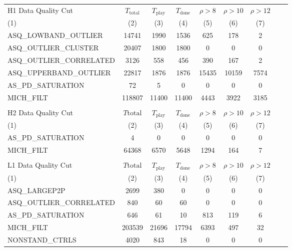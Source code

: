 \begin{table}[p]
\label{t:s2dqresults}
\begin{center}
\begin{tabular}{lcccccccc}
H1 Data Quality Cut      &$T_\mathrm{total}$&$T_\mathrm{play}$&$T_\mathrm{done}$&$\rho>8$&$\rho>10$&$\rho>12$ \\
(1)                      &(2)     &(3)    &(4)    &(5)     &(6)     &(7)\\\hline
ASQ\_LOWBAND\_OUTLIER    &  14741 &  1990 &  1536 &   625  &  178   &   2 \\
ASQ\_OUTLIER\_CLUSTER    &  20407 &  1800 &  1800 &     0  &    0   &   0 \\
ASQ\_OUTLIER\_CORRELATED &   3126 &   558 &   456 &   390  &  167   &   2 \\
ASQ\_UPPERBAND\_OUTLIER  &  22817 &  1876 &  1876 & 15435  &10159   &7574 \\
AS\_PD\_SATURATION       &     72 &     5 &     0 &     0  &    0   &   0 \\
MICH\_FILT               & 118807 & 11400 & 11400 &  4443  & 3922   &3185 \\
\hline\hline
\\
H2 Data Quality Cut      &$T\mathrm{total}$&$T_\mathrm{play}$&$T_\mathrm{done}$&$\rho>8$&$\rho>10$&$\rho>12$ \\
(1)                      &(2)     &(3)    &(4)    &(5)     &(6)     &(7)  \\\hline
AS\_PD\_SATURATION        &    4   &   0   &   0  &    0  &    0   &   0 \\
MICH\_FILT                &64368   &6570   &5648  & 1294  &  164   &   7 \\
\hline\hline
\\
L1 Data Quality Cut      &$T\mathrm{total}$&$T_\mathrm{play}$&$T_\mathrm{done}$&$\rho>8$&$\rho>10$&$\rho>12$ \\
(1)                      &(2)     &(3)    &(4)    &(5)     &(6)     &(7)  \\\hline
ASQ\_LARGEP2P            &   2699 &   380 &     0  &    0 &    0  &    0 \\
ASQ\_OUTLIER\_CORRELATED &    840 &    60 &    60  &    0 &    0  &    0 \\
AS\_PD\_SATURATION       &    646 &    61 &    10  &  813 &  119  &    6 \\
MICH\_FILT               & 203539 & 21696 & 17794  & 6393 &  497  &   32 \\
NONSTAND\_CTRLS          &   4020 &   843 &    18  &    0 &    0  &    0 \\

\end{tabular}
\end{center}
\end{table}
